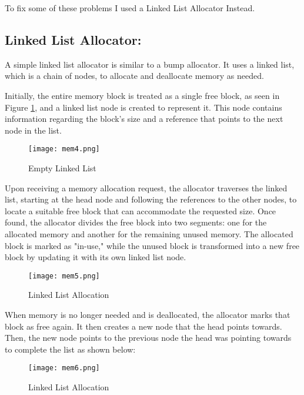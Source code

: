 \documentclass[12pt, letterpaper]{article}
\begin{document}
\medskip

To fix some of these problems I used a Linked List Allocator Instead.

\subsection{Linked List Allocator:}

A simple linked list allocator is similar to a bump allocator. It uses a linked list, which is a chain of nodes, to 
allocate and deallocate memory as needed.

Initially, the entire memory block is treated as a single free block, as seen in Figure \ref{fig:mem4}, and a linked list node 
is created to represent it. This node contains information regarding the block's size and a reference that points 
to the next node in the list.

\begin{figure}[H]
      \centering
      \texttt{[image: mem4.png]}
      \caption{Empty Linked List}
      \label{fig:mem4}
\end{figure}

Upon receiving a memory allocation request, the allocator traverses the linked list, starting at the head node and 
following the references to the other nodes, to locate a suitable free block that can accommodate the requested size. 
Once found, the allocator divides the free block into two segments: one for the allocated memory and another for the 
remaining unused memory. The allocated block is marked as "in-use," while the unused block is transformed into a new 
free block by updating it with its own linked list node.

\begin{figure}[H]
      \centering
      \texttt{[image: mem5.png]}
      \caption{Linked List Allocation}
      \label{fig:mem5}
\end{figure}

When memory is no longer needed and is deallocated, the allocator marks that block as free again. It then creates 
a new node that the head points towards. Then, the new node points to the previous node the head was pointing 
towards to complete the list as shown below: 

\begin{figure}[H]
      \centering
      \texttt{[image: mem6.png]}
      \caption{Linked List Allocation}
      \label{fig:mem6}
\end{figure}
\end{document}
